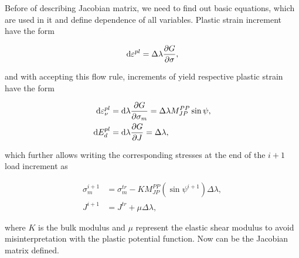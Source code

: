 Before of describing Jacobian matrix, we need to find out basic equations, which are used in it and define dependence of all variables. 
Plastic strain increment have the form 

\begin{equation}
	\dd \varepsilon^{pl} = \Delta \lambda \pdv{G}{\sigma},
\end{equation}

and with accepting this flow rule, increments of yield respective plastic strain have the form 

\begin{align}
	\dd \varepsilon_\nu^{pl} &= \dd \lambda \pdv{G}{\sigma_m} = \Delta \lambda M_{JP}^{PP} \sin \psi,\\
	\dd E_{d}^{pl} &= \dd \lambda \pdv{G}{J} = \Delta \lambda,
\end{align}

which further allows writing the corresponding stresses at the end of the $i+1$ load increment as  

\begin{align}
	\sigma_m^{i+1} &= \sigma_m^{tr} - K M_{JP}^{PP} (\sin \psi^{i+1}) \Delta \lambda,\\
	J^{i+1} &= J^{tr} + \mu \Delta \lambda,
\end{align}

where $K$ is the bulk modulus and $\mu$ represent the elastic shear modulus to avoid misinterpretation with the plastic potential function. Now can be the Jacobian matrix defined.

